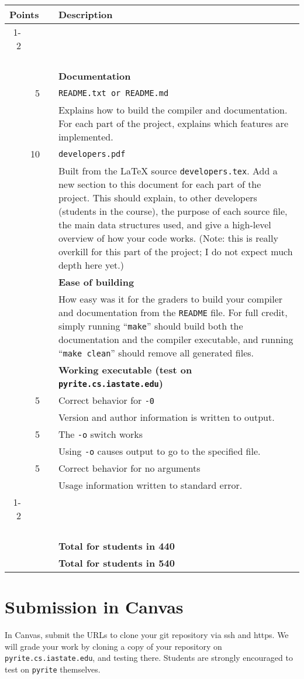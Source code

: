\documentclass{article}
\makeatletter
\newcommand{\gradeline}{ \cline{1-2} \cline{4-4} ~\\[-1.5ex] }
\newenvironment{gradetable}{\begin{longtable}{@{}rrcp{5in}} \multicolumn{2}{l}{\bf Points} & & {\bf Description}\\ \gradeline}{\end{longtable}}
\newcommand{\mainitem}[2]{\pagebreak[2] {\bf #1} &&& {\bf #2}}
\newcommand{\mainpara}[1]{~ &&& {#1} }
\newcommand{\inneritem}[2]{~ & #1 && #2}
\newcommand{\innerpara}[1]{~ & ~ && #1}
\makeatother
\begin{document}
\noindent
\begin{gradetable}
  \mainitem{15}{Documentation}
  \\[2mm]
  \inneritem{5}{\tt README.txt} or {\tt README.md}
  \\[2mm]
  \innerpara{%
    Explains how to build the compiler and documentation.
    For each part of the project,
    explains which features are implemented.
  }
  \\[2mm]
  \inneritem{10}{\tt developers.pdf}
  \\[2mm]
  \innerpara{%
    Built from the \LaTeX{} source {\tt developers.tex}.
    Add a new section to this document for each part of the project.
    This should explain, to other developers (students in the course),
    the purpose of each source file,
    the main data structures used, 
    and give a high-level overview of how your code works.
    (Note: this is really overkill for this part of the project;
    I do not expect much depth here yet.)
  }
  \\[5mm]

  \mainitem{10}{Ease of building} 
  \\[2mm]
  \mainpara{%
    How easy was it for the graders to build your compiler and
    documentation from the {\tt README} file.
    For full credit, simply running ``{\tt make}''
    should build both the documentation and the compiler executable,
    and running ``{\tt make clean}'' should remove
    all generated files.
  }
  \\[5mm]

  \mainitem{15}{Working executable (test on {\tt pyrite.cs.iastate.edu})}
  \\[2mm]
  \inneritem{5}{Correct behavior for {\tt -0}}
  \\[2mm]
  \innerpara{%
    Version and author information is written to output.
  }
  \\[3mm]
  \inneritem{5}{The {\tt -o} switch works}
  \\[2mm]
  \innerpara{%
    Using {\tt -o} causes output
    to go to the specified file.
  }
  \\[3mm]
  \inneritem{5}{Correct behavior for no arguments}
  \\[2mm]
  \innerpara{%
    Usage information written to standard error.
  }
  \\[3mm]
  \gradeline
  \mainitem{40}{Total for students in 440}
  \\
  \mainitem{40}{Total for students in 540}
\end{gradetable}


\section{Submission in Canvas}

In Canvas, submit the URLs to clone your git repository via ssh and https.
We will grade your work by cloning a copy of your repository
on {\tt pyrite.cs.iastate.edu}, and testing there.
Students are strongly encouraged to test on {\tt pyrite} themselves.
\end{document}
